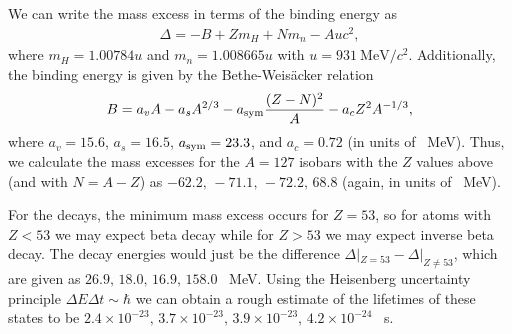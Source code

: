 \def\duedate{12/08/22}
\def\HWnum{5}



    

We can write the mass excess in terms of the binding energy as
\begin{eqnarray}
    \Delta = -B + Zm_{H} + Nm_{n} - Auc^2
,\end{eqnarray}
where $m_{H} = 1.00784u$ and $m_{n} = 1.008665u$ with $u = \SI{931}{\MeV/c^2}$.
Additionally, the binding energy is given by the Bethe-Weis\"{a}cker relation
\begin{eqnarray}
    B = a_{v}A - a_{s}A^{2/3} - a_{\rm sym} \frac{(Z - N)^2}{A} - a_{c} Z^2 A^{-1/3}
,\end{eqnarray}
where $a_{v} = 15.6$, $a_{s} = 16.5$, $a_{\rm sym} = 23.3$, and $a_{c} = 0.72$ (in units of \SI{}{\MeV}).
Thus, we calculate the mass excesses for the $A = 127$ isobars with the $Z$ values above (and with $N = A - Z$) as $-62.2,\,-71.1,\,-72.2,\,68.8$ (again, in units of \SI{}{\MeV}).

For the decays, the minimum mass excess occurs for $Z = 53$, so for atoms with $Z < 53$ we may expect beta decay while for $Z > 53$ we may expect inverse beta decay.
The decay energies would just be the difference $\Delta|_{Z=53} - \Delta|_{Z \ne 53}$, which are given as $26.9,\,18.0,\,16.9,\,158.0$ \SI{}{\MeV}.
Using the Heisenberg uncertainty principle $\Delta E \Delta t \sim \hbar$ we can obtain a rough estimate of the lifetimes of these states to be $2.4 \times 10^{-23},\,3.7 \times 10^{-23},\,3.9 \times 10^{-23},\,4.2 \times 10^{-24}$ \SI{}{\s}.


